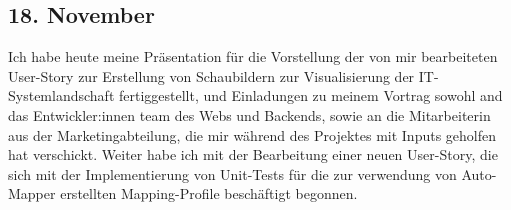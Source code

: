 \subsection{18. November}
Ich habe heute meine Präsentation für die Vorstellung der von mir bearbeiteten User-Story zur Erstellung von Schaubildern zur Visualisierung der IT-Systemlandschaft fertiggestellt, und Einladungen zu meinem Vortrag sowohl and das Entwickler:innen team des Webs und Backends, sowie an die Mitarbeiterin aus der Marketingabteilung, die mir während des Projektes mit Inputs geholfen hat verschickt. Weiter habe ich mit der Bearbeitung einer neuen User-Story, die sich mit der Implementierung von Unit-Tests für die zur verwendung von Auto-Mapper erstellten Mapping-Profile  beschäftigt begonnen.